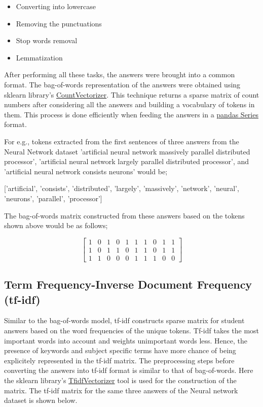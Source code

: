     \begin{itemize}
    	\item Converting into lowercase
    	\item Removing the punctuations
    	\item Stop words removal
    	\item Lemmatization 
    \end{itemize} 
    
    After performing all these tasks, the answers were brought into a common format. The bag-of-words representation of the answers were obtained using sklearn library's \href{https://scikit-learn.org/stable/modules/generated/sklearn.feature_extraction.text.CountVectorizer.html}{CountVectorizer}. This technique returns a sparse matrix of count numbers after considering all the answers and building a vocabulary of tokens in them. This process is done efficiently when feeding the answers in a \href{https://pandas.pydata.org/pandas-docs/version/0.23.4/generated/pandas.Series.html}{pandas Series} format.
    
    For e.g., tokens extracted from the first sentences of three answers from the Neural Network dataset 'artificial neural network massively parallel distributed processor', 'artificial neural network largely parallel distributed processor', and 'artificial neural network consists neurons' would be;
    
    
    ['artificial', 'consists', 'distributed', 'largely', 'massively', 'network', 'neural', 'neurons', 'parallel', 'processor']
    
    
    The bag-of-words matrix constructed from these answers based on the tokens shown above would be as follows;
    
     {\footnotesize  $$ \begin{bmatrix}
     	1 & 0 & 1 & 0 & 1 & 1 & 1 & 0 & 1 & 1 \\
     	1 & 0 & 1 & 1 & 0 & 1 & 1 & 0 & 1 & 1 \\
     	1 & 1 & 0 & 0 & 0 & 1 & 1 & 1 & 0 & 0
     	\end{bmatrix}  $$}   

    \subsection{Term Frequency-Inverse Document Frequency (tf-idf)}
    
    Similar to the bag-of-words model, tf-idf constructs sparse matrix for student answers based on the word frequencies of the unique tokens. Tf-idf takes the most important words into account and weights unimportant words less. Hence, the presence of keywords and subject specific terms have more chance of being explicitely represented in the tf-idf matrix. The preprocessing steps before converting the answers into tf-idf format is similar to that of bag-of-words. Here the sklearn library's \href{https://scikit-learn.org/stable/modules/generated/sklearn.feature_extraction.text.TfidfVectorizer.html}{TfidfVectorizer} tool is used for the construction of the matrix. The tf-idf matrix for the same three answers of the Neural network dataset is shown below.
    \vspace{3mm}
    
